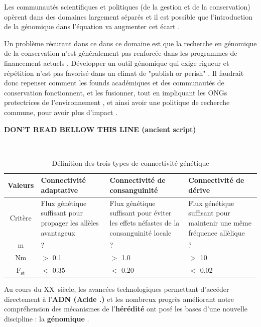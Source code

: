 \documentclass[a4paper,11pt,twoside]{report}
\begin{document}
Les communautés scientifiques et politiques (de la gestion et de la conservation) opèrent dans des domaines largement séparés \cite{shafer2015genomics}\cite{garner2015genomics} et il est possible que l'introduction de la génomique dans l'équation va augmenter cet écart \cite{shafer2015genomics}. 

Un problème récurant dans ce dans ce domaine est que la recherche en génomique de la conservation n'est généralement pas renforcée dans les programmes de financement actuels \cite{shafer2015genomics}. Développer un outil génomique qui exige rigueur et répétition n'est pas favorisé dans un climat de "publish or perish" \cite{shafer2015genomics}. Il faudrait donc repenser comment les founds académiques et des communautés de conservation fonctionnent, et les fusionner, tout en impliquant les ONGs protectrices de l'environnement \cite{garner2015genomics}, et ainsi avoir une politique de recherche commune, pour avoir plus d'impact \cite{woolf2008meaning}\cite{shafer2015genomics}.

\textbf{DON'T READ BELLOW THIS LINE (ancient script)}

~~\\

\begin{table}[ht]{
\begin{tabular}{ c p{4.5cm} p{4.5cm} p{4.5cm} }
	\centering
    Valeurs & \centering  Connectivité adaptative & \centering Connectivité de consanguinité & \centering  Connectivité de dérive \tabularnewline \hline
	Critère & \centering Flux génétique suffisant pour propager les allèles avantageux & \centering Flux génétique suffisant pour éviter les effets néfastes de la consanguinité locale & \centering Flux génétique suffisant pour maintenir une même fréquence allèlique \tabularnewline
   m &  \centering ? & \centering ? & \centering ? \tabularnewline 
   Nm & \centering $>$ 0.1 & \centering $>$ 1.0 & \centering $>$ 10 \tabularnewline
   $\text{F}_{\text{st}}$ & \centering $<$ 0.35 & \centering $<$ 0.20 & \centering $<$ 0.02 \tabularnewline
 \end{tabular}}
  \caption{Définition des trois types de connectivité génétique}
 \end{table}
 
 

 

\newpage

Au cours du \textsc{XX}\ieme~siècle, les avancées technologiques permettant d’accéder directement à l’\textbf{ADN (Acide .)} et les nombreux progrès améliorant notre compréhension des mécanismes de l’\textbf{hérédité} ont posé les bases d’une nouvelle discipline : la \textbf{génomique} \citep{eggen2003approches}. 
\end{document}
